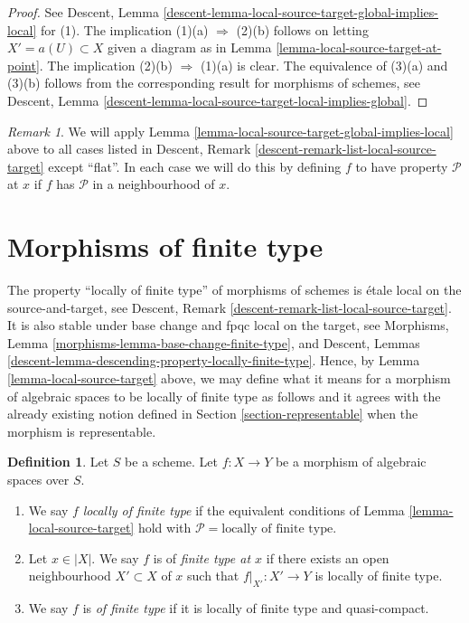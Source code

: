 \documentclass{stacks-project}
\theoremstyle{plain}
\theoremstyle{definition}
\newtheorem{definition}[subsection]{Definition}
\theoremstyle{remark}
\newtheorem{remark}[subsection]{Remark}
\numberwithin{equation}{subsection}
\begin{document}
\begin{proof}
See
Descent, Lemma \ref{descent-lemma-local-source-target-global-implies-local}
for (1). The implication (1)(a) $\Rightarrow$ (2)(b) follows on letting
$X' = a(U) \subset X$ given a diagram as in
Lemma \ref{lemma-local-source-target-at-point}.
The implication (2)(b) $\Rightarrow$ (1)(a) is clear.
The equivalence of (3)(a) and (3)(b) follows from the corresponding
result for morphisms of schemes, see
Descent, Lemma \ref{descent-lemma-local-source-target-local-implies-global}.
\end{proof}

\begin{remark}
\label{remark-when-apply}
We will apply
Lemma \ref{lemma-local-source-target-global-implies-local}
above to all cases listed in
Descent, Remark \ref{descent-remark-list-local-source-target}
except ``flat''. In each case we will do this by defining
$f$ to have property $\mathcal{P}$ at $x$ if $f$ has
$\mathcal{P}$ in a neighbourhood of $x$.
\end{remark}




\section{Morphisms of finite type}
\label{section-finite-type}

\noindent
The property ``locally of finite type'' of morphisms of schemes
is \'etale local on the source-and-target, see
Descent, Remark \ref{descent-remark-list-local-source-target}.
It is also stable under base change and fpqc local on the target, see
Morphisms, Lemma \ref{morphisms-lemma-base-change-finite-type}, and
Descent, Lemmas \ref{descent-lemma-descending-property-locally-finite-type}.
Hence, by
Lemma \ref{lemma-local-source-target}
above, we may define what it means for a morphism of algebraic spaces
to be locally of finite type as
follows and it agrees with the already existing notion defined in
Section \ref{section-representable}
when the morphism is representable.

\begin{definition}
\label{definition-locally-finite-type}
Let $S$ be a scheme.
Let $f : X \to Y$ be a morphism of algebraic spaces over $S$.
\begin{enumerate}
\item We say $f$
{\it locally of finite type} if the equivalent conditions of
Lemma \ref{lemma-local-source-target}
hold with
$\mathcal{P} = \text{locally of finite type}$.
\item Let $x \in |X|$. We say $f$ is of {\it finite type at $x$}
if there exists an open neighbourhood $X' \subset X$ of $x$ such
that $f|_{X'} : X' \to Y$ is locally of finite type.
\item We say $f$ is
{\it of finite type} if it is locally of finite type and quasi-compact.
\end{enumerate}
\end{definition}
\end{document}
